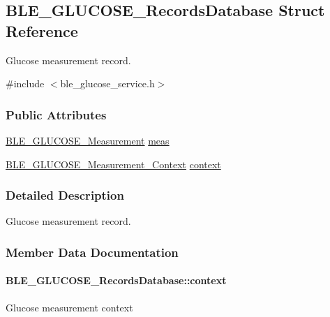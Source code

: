 \hypertarget{struct_b_l_e___g_l_u_c_o_s_e___records_database}{}\subsection{B\+L\+E\+\_\+\+G\+L\+U\+C\+O\+S\+E\+\_\+\+Records\+Database Struct Reference}
\label{struct_b_l_e___g_l_u_c_o_s_e___records_database}


Glucose measurement record.  




{\ttfamily \#include $<$ble\+\_\+glucose\+\_\+service.\+h$>$}

\subsubsection*{Public Attributes}
\begin{DoxyCompactItemize}
\item 
\hyperlink{struct_b_l_e___g_l_u_c_o_s_e___measurement}{B\+L\+E\+\_\+\+G\+L\+U\+C\+O\+S\+E\+\_\+\+Measurement} \hyperlink{struct_b_l_e___g_l_u_c_o_s_e___records_database_a758df8552b95a4b6bd49b6b77fd66054}{meas}
\item 
\hyperlink{struct_b_l_e___g_l_u_c_o_s_e___measurement___context}{B\+L\+E\+\_\+\+G\+L\+U\+C\+O\+S\+E\+\_\+\+Measurement\+\_\+\+Context} \hyperlink{struct_b_l_e___g_l_u_c_o_s_e___records_database_a25b5ca3dd8bee56ade551007378cf354}{context}
\end{DoxyCompactItemize}


\subsubsection{Detailed Description}
Glucose measurement record. 

\subsubsection{Member Data Documentation}
\paragraph[{\texorpdfstring{context}{context}}]{ B\+L\+E\+\_\+\+G\+L\+U\+C\+O\+S\+E\+\_\+\+Records\+Database\+::context}\hypertarget{struct_b_l_e___g_l_u_c_o_s_e___records_database_a25b5ca3dd8bee56ade551007378cf354}{}\label{struct_b_l_e___g_l_u_c_o_s_e___records_database_a25b5ca3dd8bee56ade551007378cf354}
Glucose measurement context 
